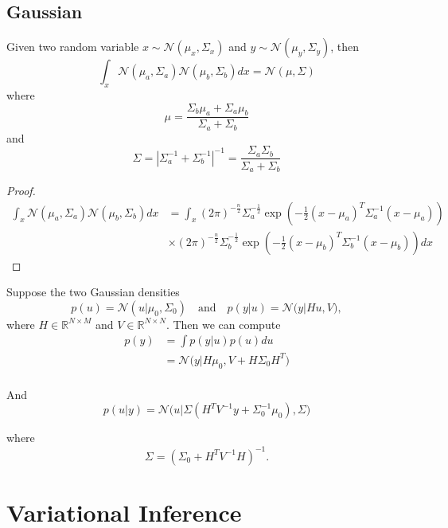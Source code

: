\documentclass[10pt]{elegantbook}
\begin{document}
\section{Gaussian}

\begin{theorem}
    Given two random variable $x \sim \mathcal N(\mu_x, \Sigma_x)$ and $y \sim \mathcal N(\mu_y, \Sigma_y)$, then
    \[
        \int_x \mathcal N(\mu_a, \Sigma_a) \mathcal N(\mu_b, \Sigma_b) dx = \mathcal N(\mu, \Sigma)
    \]
    where
    \[
        \mu = \frac{\Sigma_b \mu_a + \Sigma_a \mu_b}{\Sigma_a + \Sigma_b}
    \]
    and
    \[
        \Sigma = |\Sigma_a^{-1} + \Sigma_b^{-1}|^{-1} = \frac{\Sigma_a \Sigma_b}{\Sigma_a + \Sigma_b}
    \]
\end{theorem}

\begin{proof}
    \[
        \begin{aligned}
            \int_x \mathcal N(\mu_a, \Sigma_a) \mathcal N(\mu_b, \Sigma_b) dx
            &= \int_x (2 \pi)^{-\frac{n}{2}} \Sigma_a^{-\frac{1}{2}} \exp \left ( -\frac{1}{2} (x - \mu_a)^T \Sigma_a^{-1} (x - \mu_a) \right ) \\
            &\times (2 \pi)^{-\frac{n}{2}} \Sigma_b^{-\frac{1}{2}} \exp \left ( -\frac{1}{2} (x - \mu_b)^T \Sigma_b^{-1} (x - \mu_b) \right ) dx
        \end{aligned}
    \]    
\end{proof}

\begin{theorem}
Suppose the two Gaussian densities  
\[
p(u) = \mathcal{N}(u | \mu_0, \Sigma_0) \quad \text{and} \quad p(y|u) = \mathcal{N}\big(y \big| H u, V \big),
\]
where $ H \in \mathbb{R}^{N \times M} $ and $ V \in \mathbb{R}^{N \times N} $.  
Then we can compute
\[
\begin{aligned}
    p(y) &= \int p(y|u)  p(u)  du \\
    &= \mathcal{N} \big( y \big| H \mu_0,  V + H \Sigma_0 H^T \big) \\
\end{aligned}
\]

And
\[
    p(u|y) = \mathcal{N} \big( u \big| \Sigma \left( H^T V^{-1} y + \Sigma_0^{-1} \mu_0 \right),  \Sigma \big)
\]

where
\[
\Sigma = \left( \Sigma_0 + H^T V^{-1} H \right)^{-1}.
\]
\end{theorem}

\chapter{Variational Inference}
\end{document}
